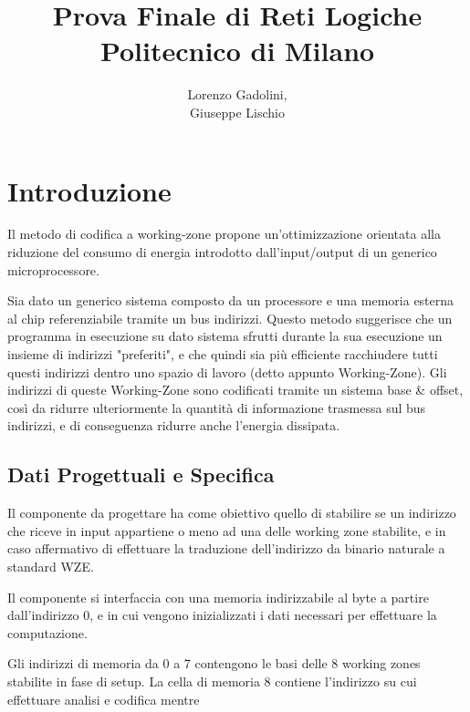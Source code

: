\documentclass{article}
\title{Prova Finale di Reti Logiche\\ \large Politecnico di Milano}
\author{Lorenzo Gadolini, \\ Giuseppe Lischio}
\begin{document}
\maketitle


\tableofcontents


\newpage
{}




\setcounter{page}{1}


\section{Introduzione}

Il metodo di codifica a working-zone propone un'ottimizzazione orientata alla riduzione del consumo di energia introdotto dall'input/output di un generico microprocessore.

Sia dato un generico sistema composto da un processore e una memoria esterna al chip referenziabile tramite un bus indirizzi. Questo metodo suggerisce che un programma in esecuzione su dato sistema sfrutti durante la sua esecuzione un insieme di indirizzi "preferiti", e che quindi sia più efficiente racchiudere tutti questi indirizzi dentro uno spazio di lavoro (detto appunto Working-Zone). Gli indirizzi di queste Working-Zone sono codificati tramite un sistema base \& offset, così da ridurre ulteriormente la quantità di informazione trasmessa sul bus indirizzi, e di conseguenza ridurre anche l'energia dissipata.



\subsection{Dati Progettuali e Specifica}


Il componente da progettare ha come obiettivo quello di stabilire se un indirizzo che riceve in input appartiene o meno ad una delle working zone stabilite, e in caso affermativo di effettuare la traduzione dell'indirizzo da binario naturale a standard WZE.

Il componente si interfaccia con una memoria indirizzabile al byte a partire dall'indirizzo 0, e in cui vengono inizializzati i dati necessari per effettuare la computazione.

Gli indirizzi di memoria da 0 a 7 contengono le basi delle 8 working zones stabilite in fase di setup. La cella di memoria 8 contiene l'indirizzo su cui effettuare analisi e codifica mentre 
\end{document}
